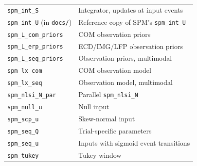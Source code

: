 \begin{table}[htbp]
\begin{tabular}{ll}
\texttt{spm\_int\_S} & Integrator, updates at input events \\
\texttt{spm\_int\_U} (in \texttt{docs/}) & Reference copy of SPM's \texttt{spm\_int\_U} \\
\texttt{spm\_L\_com\_priors} & COM observation priors \\
\texttt{spm\_L\_erp\_priors} & ECD/IMG/LFP observation priors \\
\texttt{spm\_L\_seq\_priors} & Observation priors, multimodal \\
\texttt{spm\_lx\_com} & COM observation model \\
\texttt{spm\_lx\_seq} & Observation model, multimodal \\
\texttt{spm\_nlsi\_N\_par} & Parallel \texttt{spm\_nlsi\_N} \\
\texttt{spm\_null\_u} & Null input \\
\texttt{spm\_scp\_u} & Skew-normal input \\
\texttt{spm\_seq\_Q} & Trial-specific parameters \\
\texttt{spm\_seq\_u} & Inputs with sigmoid event transitions \\
\texttt{spm\_tukey} & Tukey window \\
\bottomrule
\end{tabular}
\end{table}

